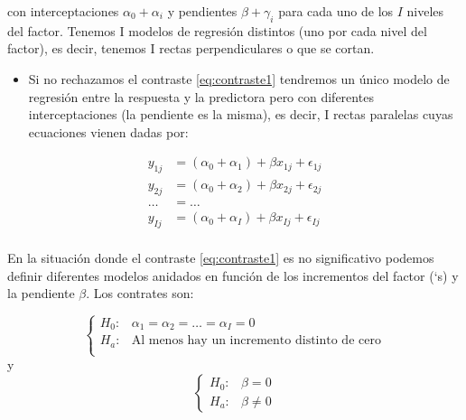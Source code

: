 \documentclass[
]{book}
\providecommand{\tightlist}{%
  \setlength{\itemsep}{0pt}\setlength{\parskip}{0pt}}
\theoremstyle{definition}
\theoremstyle{definition}
\theoremstyle{definition}
\theoremstyle{remark}
\begin{document}
con interceptaciones \(\alpha_0 + \alpha_i\) y pendientes \(\beta + \gamma_i\) para cada uno de los \(I\) niveles del factor. Tenemos I modelos de regresión distintos (uno por cada nivel del factor), es decir, tenemos I rectas perpendiculares o que se cortan.

\begin{itemize}
\tightlist
\item
  Si no rechazamos el contraste \eqref{eq:contraste1} tendremos un único modelo de regresión entre la respuesta y la predictora pero con diferentes interceptaciones (la pendiente es la misma), es decir, I rectas paralelas cuyas ecuaciones vienen dadas por:
\end{itemize}

\begin{equation}
\begin{array}{ll}
y_{1j} &= (\alpha_0 + \alpha_1) + \beta  x_{1j} + \epsilon_{1j}\\
y_{2j} &= (\alpha_0 + \alpha_2) + \beta  x_{2j} + \epsilon_{2j}\\
\ldots &= \ldots \\
y_{Ij} &= (\alpha_0 + \alpha_I) + \beta  x_{Ij} + \epsilon_{Ij}\\
\end{array}
\label{eq:modeloancovasininteraccion}
\end{equation}

En la situación donde el contraste \eqref{eq:contraste1} es no significativo podemos definir diferentes modelos anidados en función de los incrementos del factor (\alpha`s) y la pendiente \(\beta\). Los contrates son:

\begin{equation}
\left\{ 
\begin{array}{ll}
H_0: & \alpha_1 = \alpha_2 = \ldots = \alpha_I = 0\\
H_a: & \mbox{Al menos hay un incremento distinto de cero}\\
\end{array}
\right.
\label{eq:contraste2}
\end{equation}
y
\begin{equation}
\left\{ 
\begin{array}{ll}
H_0: & \beta = 0\\
H_a: & \beta \neq 0
\end{array}
\right.
\label{eq:contraste3}
\end{equation}
\end{document}
